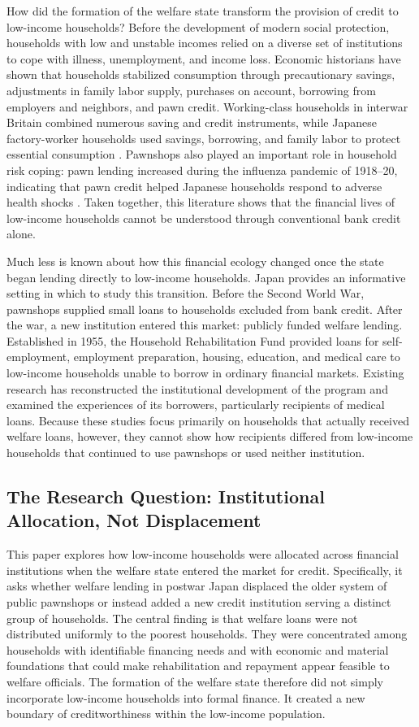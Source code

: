 \documentclass[12pt]{article}
\begin{document}
How did the formation of the welfare state transform the provision of credit to low-income households? Before the development of modern social protection, households with low and unstable incomes relied on a diverse set of institutions to cope with illness, unemployment, and income loss. Economic historians have shown that households stabilized consumption through precautionary savings, adjustments in family labor supply, purchases on account, borrowing from employers and neighbors, and pawn credit. Working-class households in interwar Britain combined numerous saving and credit instruments, while Japanese factory-worker households used savings, borrowing, and family labor to protect essential consumption \citep{Scott2012,Ogasawara2024}. Pawnshops also played an important role in household risk coping: pawn lending increased during the influenza pandemic of 1918--20, indicating that pawn credit helped Japanese households respond to adverse health shocks \citep{Inoue2021}. Taken together, this literature shows that the financial lives of low-income households cannot be understood through conventional bank credit alone.

Much less is known about how this financial ecology changed once the state began lending directly to low-income households. Japan provides an informative setting in which to study this transition. Before the Second World War, pawnshops supplied small loans to households excluded from bank credit. After the war, a new institution entered this market: publicly funded welfare lending. Established in 1955, the Household Rehabilitation Fund provided loans for self-employment, employment preparation, housing, education, and medical care to low-income households unable to borrow in ordinary financial markets. Existing research has reconstructed the institutional development of the program and examined the experiences of its borrowers, particularly recipients of medical loans. Because these studies focus primarily on households that actually received welfare loans, however, they cannot show how recipients differed from low-income households that continued to use pawnshops or used neither institution.

\subsection{The Research Question: Institutional Allocation, Not Displacement}

This paper explores how low-income households were allocated across financial institutions when the welfare state entered the market for credit. Specifically, it asks whether welfare lending in postwar Japan displaced the older system of public pawnshops or instead added a new credit institution serving a distinct group of households. The central finding is that welfare loans were not distributed uniformly to the poorest households. They were concentrated among households with identifiable financing needs and with economic and material foundations that could make rehabilitation and repayment appear feasible to welfare officials. The formation of the welfare state therefore did not simply incorporate low-income households into formal finance. It created a new boundary of creditworthiness within the low-income population.
\end{document}

